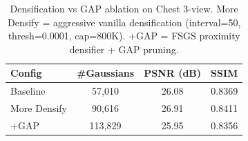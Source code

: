\begin{table}[t]
\centering
\caption{Densification vs GAP ablation on Chest 3-view. More Densify = aggressive vanilla densification (interval=50, thresh=0.0001, cap=800K). +GAP = FSGS proximity densifier + GAP pruning.}
\label{tab:densify_vs_gap}
\begin{tabular}{lccc}
\toprule
 Config & \#Gaussians & PSNR (dB) & SSIM \\
\midrule
 Baseline & 57,010 & 26.08 & 0.8369 \\
 More Densify & 90,616 & 26.91 & 0.8411 \\
 +GAP & 113,829 & 25.95 & 0.8356 \\
\bottomrule
\end{tabular}
\end{table}
